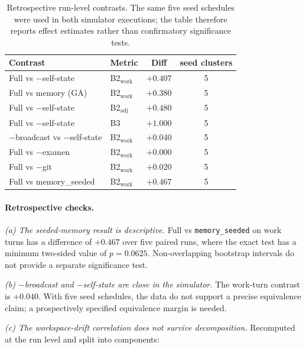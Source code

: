 \documentclass{article}
\begin{document}
\begin{table}[h]
\centering\small
\begin{tabular}{llcc}
\toprule
\textbf{Contrast} & \textbf{Metric} & \textbf{Diff} & \textbf{seed clusters} \\
\midrule
Full vs $-$self-state & B2$_{\mathrm{work}}$ & $+0.407$ & 5 \\
Full vs memory (GA) & B2$_{\mathrm{work}}$ & $+0.380$ & 5 \\
Full vs $-$self-state & B2$_{\mathrm{adj}}$ & $+0.480$ & 5 \\
Full vs $-$self-state & B3 & $+1.000$ & 5 \\
$-$broadcast vs $-$self-state & B2$_{\mathrm{work}}$ & $+0.040$ & 5 \\
Full vs $-$examen & B2$_{\mathrm{work}}$ & $+0.000$ & 5 \\
Full vs $-$git & B2$_{\mathrm{work}}$ & $+0.020$ & 5 \\
Full vs memory\_seeded & B2$_{\mathrm{work}}$ & $+0.467$ & 5 \\
\bottomrule
\end{tabular}
\caption{Retrospective run-level contrasts. The same five seed schedules were used in both simulator executions; the table therefore reports effect estimates rather than confirmatory significance tests.}
\label{tab:stats}
\end{table}

\paragraph{Retrospective checks.}

\emph{(a) The seeded-memory result is descriptive.} Full vs \texttt{memory\_seeded} on work turns has a difference of $+0.467$ over five paired runs, where the exact test has a minimum two-sided value of $p=0.0625$. Non-overlapping bootstrap intervals do not provide a separate significance test.

\emph{(b) $-$broadcast and $-$self-state are close in the simulator.} The work-turn contrast is $+0.040$. With five seed schedules, the data do not support a precise equivalence claim; a prospectively specified equivalence margin is needed.

\emph{(c) The workspace-drift correlation does not survive decomposition.} Recomputed at the run level and split into components:
\end{document}
